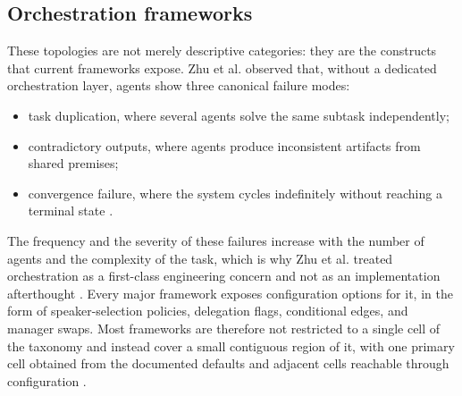 \subsection{Orchestration frameworks}
\label{subsec:topology-frameworks}

These topologies are not merely descriptive categories: they are the constructs that current frameworks expose. Zhu et al. observed that, without a dedicated orchestration layer, agents show three canonical failure modes:
\begin{itemize}
	\item task duplication, where several agents solve the same subtask independently;
	\item contradictory outputs, where agents produce inconsistent artifacts from shared premises;
	\item convergence failure, where the system cycles indefinitely without reaching a terminal state \cite{zhuLLMBasedMultiAgentOrchestration2026a}.
\end{itemize}
The frequency and the severity of these failures increase with the number of agents and the complexity of the task, which is why Zhu et al. treated orchestration as a first-class engineering concern and not as an implementation afterthought \cite{zhuLLMBasedMultiAgentOrchestration2026a}. Every major framework exposes configuration options for it, in the form of speaker-selection policies, delegation flags, conditional edges, and manager swaps. Most frameworks are therefore not restricted to a single cell of the taxonomy and instead cover a small contiguous region of it, with one primary cell obtained from the documented defaults and adjacent cells reachable through configuration \cite{zhuLLMBasedMultiAgentOrchestration2026a}.
